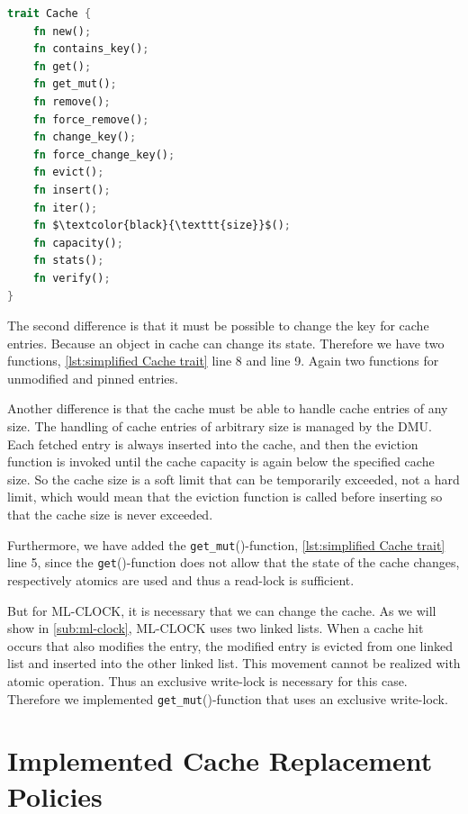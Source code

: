 \documentclass[
	12pt,
	a4paper,
	abstract,
	bibliography=totoc,
	chapterprefix,
	headings=openright,
	numbers=endperiod,
	parskip=half,
	twoside,
]{scrreprt}
\begin{document}
\bigskip

\begin{lstlisting}[language=Rust,mathescape=true,caption={simplified Cache trait without type aliases, generics, function parameters and function return types},label=lst:simplified Cache trait]
trait Cache {
    fn new();
    fn contains_key();
    fn get();
    fn get_mut();
    fn remove();
    fn force_remove();
    fn change_key();
    fn force_change_key();
    fn evict();
    fn insert();
    fn iter();
    fn $\textcolor{black}{\texttt{size}}$();
    fn capacity();
    fn stats();
    fn verify();
}
\end{lstlisting}

The second difference is that it must be possible to change the key for cache entries.
Because an object in cache can change its state. 
Therefore we have two functions, \cref{lst:simplified Cache trait} line 8 and line 9. 
Again two functions for unmodified and pinned entries.

Another difference is that the cache must be able to handle cache entries of any size.
The handling of cache entries of arbitrary size is managed by the DMU.
Each fetched entry is always inserted into the cache, and then the eviction function is invoked 
until the cache capacity is again below the specified cache size.
So the cache size is a soft limit that can be temporarily exceeded, not a hard limit, which would mean that the 
eviction function is called before inserting so that the cache size is never exceeded.

Furthermore, we have added the \texttt{get\_mut}()-function, \cref{lst:simplified Cache trait} line 5, 
since the \texttt{get}()-function does not allow that the state of the cache changes, 
respectively atomics are used and thus a read-lock is sufficient.

But for ML-CLOCK, it is necessary that we can change the cache.
As we will show in \cref{sub:ml-clock}, ML-CLOCK uses two linked lists.
When a cache hit occurs that also modifies the entry,
the modified entry is evicted from one linked list and inserted into the other linked list.
This movement cannot be realized with atomic operation.
Thus an exclusive write-lock is necessary for this case. 
Therefore we implemented \texttt{get\_mut}()-function that uses an exclusive write-lock.


\section{Implemented Cache Replacement Policies}
\label{sec:implemented cache replacement policies}
\end{document}

